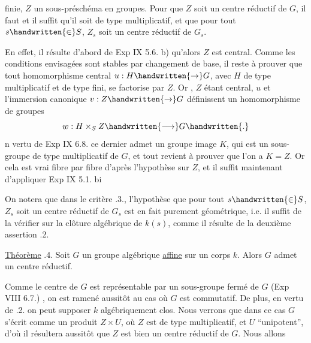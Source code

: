 finie,  $Z$ un sous-préschéma en groupes. Pour que $Z$ soit un centre réductif de $G$, il faut et il suffit qu'il soit de type multiplicatif, et que pour tout $s\handwritten{\in}S$,  $Z_s$ soit un centre réductif de $G_s$.

En effet, il résulte d'abord de Exp IX 5.6. b) qu'alors $Z$ est central. Comme les conditions envisagées sont stables par changement de base, il reste à prouver que tout homomorphisme central $u:H\handwritten{\to}G$, avec $H$ de type multiplicatif et de type fini, se factorise par $Z$. Or , $Z$ étant central, $u$ et l'immersion canonique $v:Z\handwritten{\to}G$ définissent un homomorphisme de groupes
\[
w:H\times_S Z\handwritten{\longrightarrow}G\handwritten{.}
\]
n vertu de Exp IX 6.8. ce dernier admet un groupe image $K$, qui est un sous-groupe de type multiplicatif de $G$, et tout revient à prouver que l'on a $K=Z$. Or cela est vrai fibre par fibre d'après l'hypothèse sur $Z$, et il suffit maintenant d'appliquer Exp IX 5.1. bi 

On notera que dans le critère .3., l'hypothèse que pour tout $s\handwritten{\in}S$, $Z_s$ soit un centre réductif de $G_s$ est en fait purement géométrique, i.e. il suffit de la vérifier sur la clôture algébrique de $k(s)$, comme il résulte de la deuxième assertion .2.

\uline{Théorème} .4. Soit $G$ un groupe algébrique \uline{affine} sur un corps $k$. Alors $G$ admet un centre réductif.

Comme le centre de $G$ est représentable par un sous-groupe fermé de $G$ (Exp VIII 6.7.) , on est ramené aussitôt au cas où $G$ est commutatif. De plus, en vertu de .2. on peut supposer $k$ algébriquement clos. Nous verrons  que dans ce cas $G$ s'écrit comme un produit  $Z\times U$, où $Z$ est de type multiplicatif, et $U$ \textquotedblleft unipotent'', d'où il résultera aussitôt que $Z$ est bien un centre réductif de $G$. Nous allons
